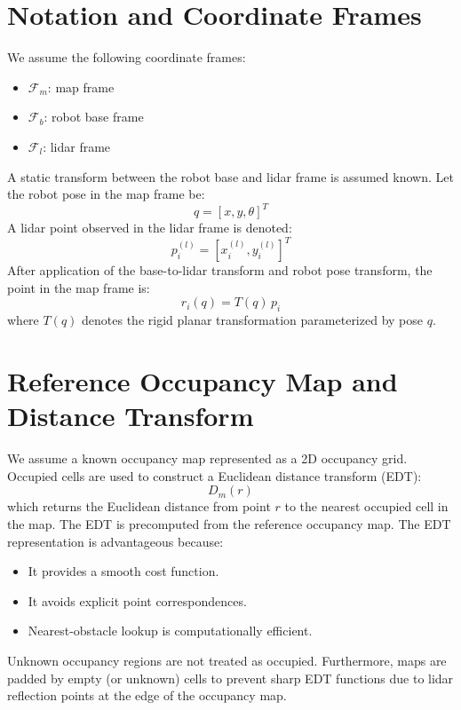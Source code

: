 \documentclass[11pt]{article}
\begin{document}
\section{Notation and Coordinate Frames}

We assume the following coordinate frames:
\begin{itemize}
    \item $\mathcal{F}_m$: map frame
    \item $\mathcal{F}_b$: robot base frame
    \item $\mathcal{F}_l$: lidar frame
\end{itemize}
A static transform between the robot base and lidar frame is assumed known. Let the robot pose in the map frame be:
\begin{equation}
q = [x, y, \theta]^T
\end{equation}
A lidar point observed in the lidar frame is denoted:
\begin{equation}
p_i^{(l)} = [x_i^{(l)}, y_i^{(l)}]^T
\end{equation}
After application of the base-to-lidar transform and robot pose transform, the point in the map frame is:
\begin{equation}
r_i(q) = T(q) \, p_i
\end{equation}
where $T(q)$ denotes the rigid planar transformation parameterized by pose $q$.

\section{Reference Occupancy Map and Distance Transform}

We assume a known occupancy map represented as a 2D occupancy grid. Occupied cells are used to construct a Euclidean distance transform (EDT):
\begin{equation}
D_m(r)
\end{equation}
which returns the Euclidean distance from point $r$ to the nearest occupied cell in the map. The EDT is precomputed from the reference occupancy map. The EDT representation is advantageous because:
\begin{itemize}
    \item It provides a smooth cost function.
    \item It avoids explicit point correspondences.
    \item Nearest-obstacle lookup is computationally efficient.
\end{itemize}
Unknown occupancy regions are not treated as occupied. Furthermore, maps are padded by empty (or unknown) cells to prevent sharp EDT functions due to lidar reflection points at the edge of the occupancy map.
\end{document}
